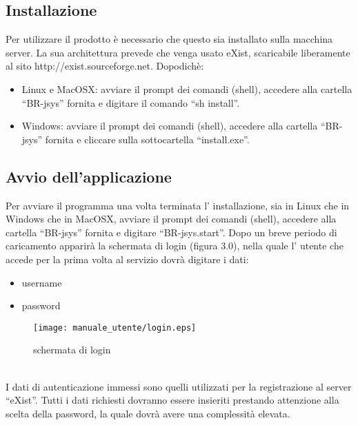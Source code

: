 \subsection{Installazione}
Per utilizzare il prodotto \`e necessario che questo sia installato sulla macchina server. La sua architettura prevede che venga usato eXist, scaricabile liberamente al sito http://exist.sourceforge.net. Dopodich\`e:
\begin{itemize}
\item Linux e MacOSX: avviare il prompt dei comandi (shell), accedere alla cartella ``BR-jsys'' fornita e digitare il comando ``sh install''.
\item Windows: avviare il prompt dei comandi (shell), accedere alla cartella ``BR-jsys'' fornita e cliccare sulla sottocartella ``install.exe''.
\end{itemize}
\subsection{Avvio dell'applicazione}
Per avviare il programma una volta terminata l' installazione, sia in Linux che in Windows che in MacOSX, avviare il prompt dei comandi (shell), accedere alla cartella ``BR-jsys'' fornita e digitare ``BR-jsys.start''. Dopo un breve periodo di caricamento apparir\`a la schermata di login (figura 3.0), nella quale l' utente che accede per la prima volta al servizio dovr\`a digitare i dati: 
\begin{itemize}
\item username
\item password
\\
\end{itemize}
\begin{figure}[htbp]
\begin{center}
\texttt{[image: manuale\_utente/login.eps]}
\end{center}
\caption{schermata di login}
\label{figura 3.0}
\end{figure}
\\
I dati di autenticazione immessi sono quelli utilizzati per la registrazione al server ``eXist''. Tutti i dati richiesti dovranno essere insieriti prestando attenzione alla scelta della password, la quale dovr\`a avere una complessit\`a elevata. 

